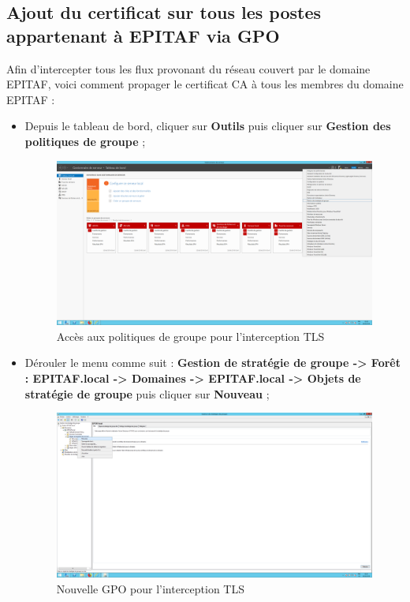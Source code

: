 \subsection{Ajout du certificat sur tous les postes appartenant à EPITAF via GPO}
Afin d'intercepter tous les flux provonant du réseau couvert par le domaine EPITAF, voici comment propager le certificat CA à tous les membres du domaine EPITAF :
\begin{itemize}
    \item Depuis le tableau de bord, cliquer sur \textbf{Outils} puis cliquer sur \textbf{Gestion des politiques de groupe} ;
\begin{figure}[h!]
    \begin{center}
        \includegraphics[scale=0.20]{Interception_Screenshots/GPO0.png}
        \caption{Accès aux politiques de groupe pour l'interception TLS}
    \end{center}
\end{figure}
\FloatBarrier


\item Dérouler le menu comme suit : \textbf{Gestion de stratégie de groupe -> Forêt : EPITAF.local -> Domaines -> EPITAF.local -> Objets de stratégie de groupe} puis cliquer sur \textbf{Nouveau} ;
\begin{figure}[h!]
    \begin{center}
        \includegraphics[scale=0.20]{Interception_Screenshots/GPO1.png}
        \caption{Nouvelle GPO pour l'interception TLS}
    \end{center}
\end{figure}
\FloatBarrier


\end{itemize}
